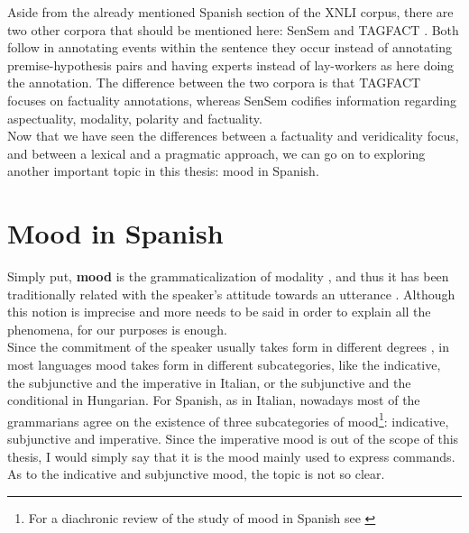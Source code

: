 Aside from the already mentioned Spanish section of the XNLI corpus, there are two other corpora that should be mentioned here: SenSem \citep{fernandez2014sensem} and TAGFACT \citep{fernandez2020tagfact}. Both follow \citet{sauri2009factbank} in annotating events within the sentence they occur instead of annotating premise-hypothesis pairs and having experts instead of lay-workers as here doing the annotation. The difference between the two corpora is that TAGFACT focuses on factuality annotations, whereas SenSem codifies information regarding aspectuality, modality, polarity and factuality.\\

Now that we have seen the differences between a factuality and veridicality focus, and between a lexical and a pragmatic approach, we can go on to exploring another important topic in this thesis: mood in Spanish.\\

\section{Mood in Spanish}
\label{sect:spamood}

Simply put, \textbf{mood} is the grammaticalization of modality \citep{lyons1995linguistic,sanchez2011aproximacion}, and thus it has been traditionally related with the speaker's attitude towards an utterance \citep{lyons1995linguistic,espanola2010nueva}. Although this notion is imprecise \citep{espanola2010nueva} and more needs to be said in order to explain all the phenomena, for our purposes is enough.\\

Since the commitment of the speaker usually takes form in different degrees \citep{lyons1995linguistic}, in most languages mood takes form in different subcategories, like the indicative, the subjunctive and the imperative in Italian, or the subjunctive and the conditional in Hungarian. For Spanish, as in Italian, nowadays most of the grammarians agree on the existence of three subcategories of mood\footnote{For a diachronic review of the study of mood in Spanish see \citet{calvo1995modo}}: indicative, subjunctive and imperative. Since the imperative mood is out of the scope of this thesis, I would simply say that it is the mood mainly used to express commands. As to the indicative and subjunctive mood, the topic is not so clear.\\


